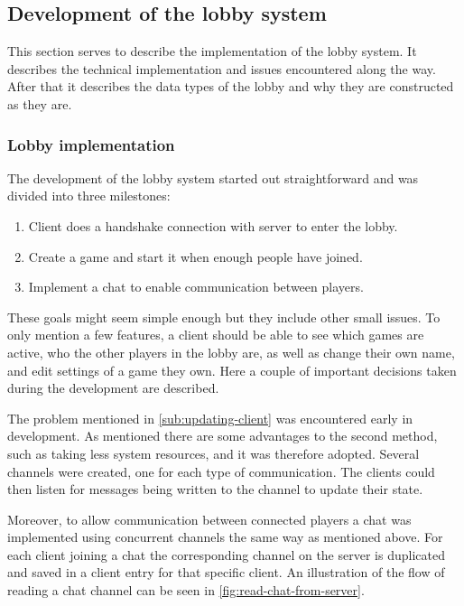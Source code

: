 \documentclass[a4paper]{article}
\begin{document}

\subsection{Development of the lobby system}
\label{sub:lobby-development}
This section serves to describe the implementation of the lobby system. It describes the technical implementation and issues encountered along the way. After that it describes the data types of the lobby and why they are constructed as they are.


\subsubsection{Lobby implementation}
The development of the lobby system started out straightforward and was divided into three milestones:
\begin{enumerate}
    \item Client does a handshake connection with server to enter the lobby.
    \item Create a game and start it when enough people have joined.
    \item Implement a chat to enable communication between players.
\end{enumerate}
These goals might seem simple enough but they include other small issues. To only mention a few features, a client should be able to see which games are active, who the other players in the lobby are, as well as change their own name, and edit settings of a game they own. Here a couple of important decisions taken during the development are described.

The problem mentioned in \cref{sub:updating-client} was encountered early in development. As mentioned there are some advantages to the second method, such as taking less system resources, and it was therefore adopted. Several channels were created, one for each type of communication. The clients could then listen for messages being written to the channel to update their state. 

Moreover, to allow communication between connected players a chat was implemented using concurrent channels the same way as mentioned above. For each client joining a chat the corresponding channel on the server is duplicated and saved in a client entry for that specific client. An illustration of the flow of reading a chat channel can be seen in \cref{fig:read-chat-from-server}.
\end{document}
